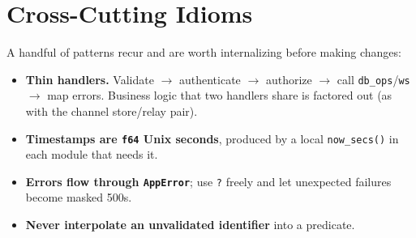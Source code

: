 \section{Cross-Cutting Idioms}
A handful of patterns recur and are worth internalizing before making changes:
\begin{itemize}
  \item \textbf{Thin handlers.} Validate $\to$ authenticate $\to$ authorize $\to$
        call \verb|db_ops|/\verb|ws| $\to$ map errors. Business logic that two
        handlers share is factored out (as with the channel store/relay pair).
  \item \textbf{Timestamps are \texttt{f64} Unix seconds}, produced by a local
        \verb|now_secs()| in each module that needs it.
  \item \textbf{Errors flow through \texttt{AppError}}; use \verb|?| freely and
        let unexpected failures become masked 500s.
  \item \textbf{Never interpolate an unvalidated identifier} into a predicate.
\end{itemize}

